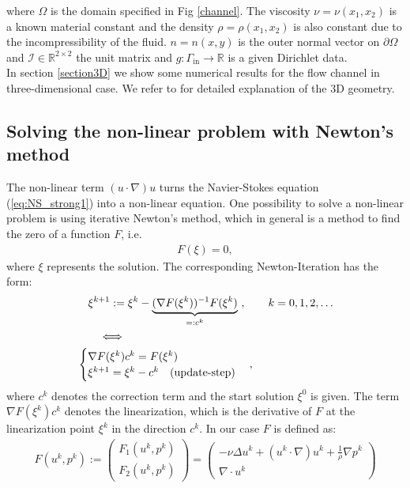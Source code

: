 \documentclass[a4paper, 11pt, twoside]{article}
\begin{document}
where $\Omega$ is the domain specified in Fig \ref{channel}.
The viscosity $\nu = \nu(x_1, x_2)$ is a known material constant and the
density $\rho = \rho(x_1, x_2)$ is also constant due to the incompressibility of the fluid. 
$ n = n(x, y)$ is the outer normal vector on $ \partial \Omega$ and $ \mathcal {I} \in \mathbb {R} ^ {2 \times 2} $ the unit matrix and $g:\Gamma_{\text{in}}\rightarrow \mathbb{R}$ is a given Dirichlet data. \\
In section \ref{section3D} we show some numerical results for the flow channel in three-dimensional case. We refer to  \cite{Turek96recentbenchmark} for detailed explanation of the 3D geometry.

\subsection{Solving the non-linear problem with Newton's method}

The non-linear term $(u\cdot \nabla)u$ turns the Navier-Stokes equation (\ref{eq:NS_strong1}) into a non-linear equation. One possibility 
to solve a non-linear problem is using iterative Newton's method, which in general is a method to find the zero of a function $F$, i.e. 
\begin{align*}
F(\xi)=0,
\end{align*}
where $\xi$ represents the solution. The corresponding Newton-Iteration has the form:
\begin{align}
&\quad\xi^{k+1}:=\xi^k-\underbrace{(\nabla F(\xi^k))^{-1}F(\xi^k)}_{=:c^k}\ ,\qquad k=0,1,2,\ldots \nonumber\\
&\qquad \Longleftrightarrow \nonumber\\
&\begin{cases}
\nabla F(\xi^k)c^k=F(\xi^k) \\
\xi^{k+1}=\xi^k-c^k  \quad \textnormal{(update-step)} 
\end{cases},\label{Newtonstep}
\end{align}
where $c^k$ denotes the correction term and the start solution $\xi^0$ is given.  %
The term $\nabla F(\xi^k)c^k$ denotes the linearization, which is the derivative of $F$ at the linearization point $\xi^k$ in the direction $c^k$. In our case $F$ is defined as:
\begin{align}
F(u^k,p^k):=\begin{pmatrix}F_1(u^k,p^k)\\ F_2(u^k,p^k)\end{pmatrix} = \begin{pmatrix}-\nu \Delta u^k + (u^k \cdot \nabla ) u^k + \frac{1}{\rho} \nabla p^k \\  \nabla \cdot u^k  \end{pmatrix}
\label{residual}
\end{align}
\end{document}

